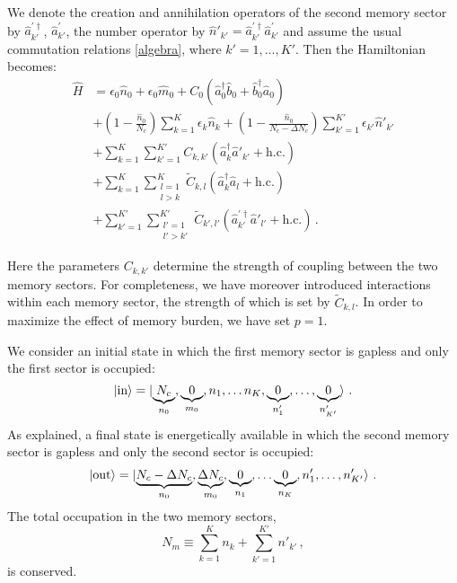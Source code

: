 \documentclass[aps,prd,reprint,superscriptaddress,nofootinbib]{revtex4-2}
\begin{document}
We denote the creation and annihilation operators of the second memory sector by $\hat{a}^{'\dagger}_{k'}$, $\hat{a}^{'}_{k'}$, the number operator by $\hat{n}'_{k'} =\hat{a}^{'\dagger}_{k'} \hat{a}^{'}_{k'}$ and assume  the usual commutation relations \eqref{algebra}, where $k'=1,\ldots, K'$. Then the Hamiltonian becomes:
\begin{align}
\hat{H} &= \epsilon_0 \hat{n}_0 + \epsilon_0 \hat{m}_0  +  C_0\left( \hat{a}_0^\dagger \hat{b}_0 + \hat{b}_0^\dagger \hat{a}_0\right) 
\nonumber\\
& +  \left(1-\frac{\hat{n}_0}{N_c}\right) \sum_{k =1}^K \epsilon_k \hat{n}_k
+  \left(1-\frac{\hat{n}_0}{N_c-\Delta N_c}\right) \sum_{k'=1}^{K'} \epsilon_{k'} \hat{n}'_{k'} 
\nonumber\\
& + \sum_{k=1}^{K}\sum_{k'=1}^{K'} C_{k,k'}\left( \hat{a}_k^\dagger \hat{a}'_{k'} +  \text{h.c.}\right) 
\nonumber \\
& +\sum_{k=1}^{K}\sum_{\substack{l=1\\l> k}}^{K} \tilde{C}_{k,l}\left( \hat{a}_k^\dagger \hat{a}_l +  \text{h.c.}\right)
\nonumber\\
& + \sum_{k'=1}^{K'}\sum_{\substack{l'=1\\l'> k'}}^{K'}  \tilde{C}_{k',l'}\left( \hat{a}_{k'}^{'\dagger} \hat{a}'_{l'} +  \text{h.c.}\right) \,.
\label{fullHamiltonian}
\end{align}



Here the parameters $C_{k,k'}$ determine the strength of coupling between 
the two memory sectors. For completeness, we have moreover introduced interactions within each memory sector, the strength of which is set by $ \tilde{C}_{k,l}$. In order to maximize the effect of memory burden, we have 
set $p=1$.

We consider an initial state in which the first memory sector is gapless and only the first sector is occupied:
\begin{equation} \label{initialState}
\ket{\text{in}}=\ket{\underbrace{N_c}_{n_0},\underbrace{0}_{m_0},n_1, \ldots n_K, \underbrace{0}_{n'_1}, \ldots, \underbrace{0}_{n'_{K'}}} \,.
\end{equation}
As explained, a final state is energetically available in which the second memory sector is gapless and only the second sector is occupied:
\begin{equation} \label{finalState}
\ket{\text{out}}=\ket{\underbrace{N_c-\Delta N_c}_{n_0},\underbrace{\Delta N_c}_{m_0},\underbrace{0}_{n_1}, \ldots \underbrace{0}_{n_K}, n'_1, \ldots, n'_{K'}} \,.
\end{equation}
The total occupation in the two memory sectors, 
\begin{equation}
N_m \equiv	\sum_{k =1}^K n_k + \sum_{k' =1}^{K'} n'_{k'} \,, 
\end{equation}
is conserved.
\end{document}
